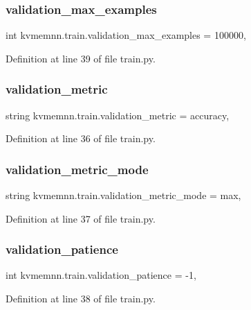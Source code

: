 \subsubsection{\texorpdfstring{validation\+\_\+max\+\_\+examples}{validation\_max\_examples}}
{\footnotesize\ttfamily int kvmemnn.\+train.\+validation\+\_\+max\+\_\+examples = 100000,}



Definition at line 39 of file train.\+py.

\mbox{\label{namespacekvmemnn_1_1train_a4c15daa1ca93b1aad51f7a0dbd793af9}} 
\subsubsection{\texorpdfstring{validation\+\_\+metric}{validation\_metric}}
{\footnotesize\ttfamily string kvmemnn.\+train.\+validation\+\_\+metric = \textquotesingle{}accuracy\textquotesingle{},}



Definition at line 36 of file train.\+py.

\mbox{\label{namespacekvmemnn_1_1train_a0d65ef7312ee19cd54bd85a02be27dbe}} 
\subsubsection{\texorpdfstring{validation\+\_\+metric\+\_\+mode}{validation\_metric\_mode}}
{\footnotesize\ttfamily string kvmemnn.\+train.\+validation\+\_\+metric\+\_\+mode = \textquotesingle{}max\textquotesingle{},}



Definition at line 37 of file train.\+py.

\mbox{\label{namespacekvmemnn_1_1train_acc0909255294aaa667d7e7b0b3de1ae6}} 
\subsubsection{\texorpdfstring{validation\+\_\+patience}{validation\_patience}}
{\footnotesize\ttfamily int kvmemnn.\+train.\+validation\+\_\+patience = -\/1,}



Definition at line 38 of file train.\+py.


